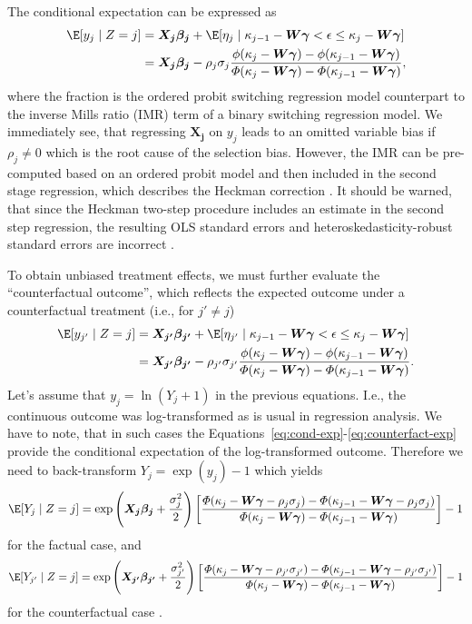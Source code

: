 \documentclass[%
    twoside, openright, titlepage, numbers=noenddot,%
    cleardoublepage=empty,%
    abstract=false,%
    BCOR=5.5mm, paper=a5, fontsize=10pt,%
]{scrreprt}
\begin{document}
The conditional expectation can be expressed as
%
\begin{equation} \label{eq:cond-exp}
\begin{aligned}
\E[y_j \mid Z = j] &= \Xb + \E[\eta_j \mid \kappa_{j-1} - \Wg < \epsilon \le \kappa_j - \Wg] \\
&= \Xb - \rho_j\sigma_j \frac{\phi(\kappa_j - \Wg) - \phi(\kappa_{j-1} - \Wg)}{\Phi(\kappa_j - \Wg) - \Phi(\kappa_{j-1} - \Wg)},
\end{aligned}
\end{equation}
%
where the fraction is the ordered probit switching regression model counterpart to the inverse Mills ratio (IMR) term of a binary switching regression model. We immediately see, that regressing $\boldsymbol{X_j}$ on $y_j$ leads to an omitted variable bias if $\rho_j \neq 0$ which is the root cause of the selection bias. However, the IMR can be pre-computed based on an ordered probit model and then included in the second stage regression, which describes the Heckman correction \citep{Heckman:1979}. It should be warned, that since the Heckman two-step procedure includes an estimate in the second step regression, the resulting OLS standard errors and heteroskedasticity-robust standard errors are incorrect \citep{Greene:2002}.

To obtain unbiased treatment effects, we must further evaluate the ``counterfactual outcome'', which reflects the expected outcome under a counterfactual treatment (i.e., for $j' \neq j$)
%
\begin{equation} \label{eq:counterfact-exp}
\begin{aligned}
\E[y_{j'} \mid Z = j] &= \Xbd + \E[\eta_{j'} \mid \kappa_{j-1} - \Wg < \epsilon \le \kappa_j - \Wg] \\
&= \Xbd - \rho_{j'}\sigma_{j'} \frac{\phi(\kappa_j - \Wg) - \phi(\kappa_{j-1} - \Wg)}{\Phi(\kappa_j - \Wg) - \Phi(\kappa_{j-1} - \Wg)}.
\end{aligned}
\end{equation}
%
Let's assume that $y_j = \ln(Y_j + 1)$ in the previous equations. I.e., the continuous outcome was log-transformed as is usual in regression analysis. We have to note, that in such cases the Equations~\ref{eq:cond-exp}-\ref{eq:counterfact-exp} provide the conditional expectation of the log-transformed outcome. Therefore we need to back-transform $Y_j = \exp(y_j) - 1$ which yields
%
\begin{equation} \label{eq:log-cond-exp}
\E[Y_j \mid Z = j] =
\exp\left(\Xb + \frac{\sigma_j^2}{2}\right)
\left[
\frac{\Phi(\kappa_j - \Wg - \rho_j\sigma_j) - \Phi(\kappa_{j-1} - \Wg - \rho_j\sigma_j)}
{\Phi(\kappa_j - \Wg) - \Phi(\kappa_{j-1} - \Wg)}
\right] - 1
\end{equation}
%
for the factual case, and
%
\begin{equation} \label{eq:log-counterfact-exp}
\E[Y_{j'} \mid Z = j] =
\exp\left(\Xbd + \frac{\sigma_{j'}^2}{2}\right)
\left[
\frac{\Phi(\kappa_j - \Wg - \rho_{j'}\sigma_{j'}) - \Phi(\kappa_{j-1} - \Wg - \rho_{j'}\sigma_{j'})}
{\Phi(\kappa_j - \Wg) - \Phi(\kappa_{j-1} - \Wg)}
\right] - 1
\end{equation}
%
for the counterfactual case \citep{Wang+Mokhtarian:2024}.
\end{document}
